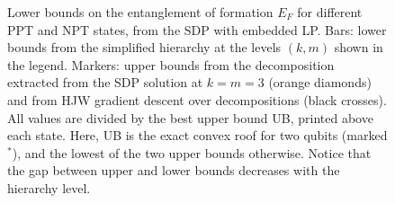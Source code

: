 %
\begin{figure}
  \centering
    \caption{Lower bounds on the entanglement of formation $E_F$ for different PPT and NPT states, from the SDP with embedded LP. Bars: lower bounds from the simplified hierarchy at the levels $(k,m)$ shown in the legend. Markers: upper bounds from the decomposition extracted from the SDP solution at $k=m=3$ (orange diamonds) and from HJW gradient descent over decompositions (black crosses). All values are divided by the best upper bound UB, printed above each state. Here, UB is the exact convex roof for two qubits (marked $^*$), and the lowest of the two upper bounds otherwise. Notice that the gap between upper and lower bounds decreases with the hierarchy level.}
  \label{fig:EoF}
\end{figure}